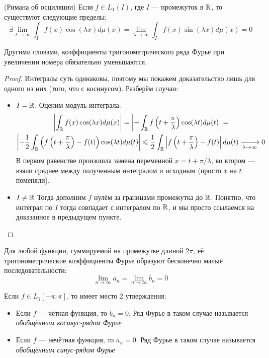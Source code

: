\begin{theorem} (Римана об осциляции)
	Если $f \in L_1(I)$, где $I$ --- промежуток в $\mathbb{R}$, то существуют следующие пределы:
	\[
		\exists \lim_{\lambda \to \infty} \int_I f(x)\cos(\lambda x)d\mu(x) = \lim_{\lambda \to \infty} \int_I f(x)\sin(\lambda x)d\mu(x) = 0
	\]
\end{theorem}

\begin{note}
	Другими словами, коэффициенты тригонометрического ряда Фурье при увеличении номера обязательно уменьшаются.
\end{note}

\begin{proof}
	Интегралы суть одинаковы, поэтому мы покажем доказательство лишь для одного из них (того, что с косинусом). Разберём случаи:
	\begin{itemize}
		\item $I = \mathbb{R}$. Оценим модуль интеграла:
		\begin{multline*}
			\left|\int_{\mathbb{R}} f(x)\cos(\lambda x)d\mu(x)\right| = \left|-\int_{\mathbb{R}} f\left(t + \frac{\pi}{\lambda}\right)\cos(\lambda t)d\mu(t)\right| =
			\\
			\left|-\frac{1}{2}\int_{\mathbb{R}} \left(f\left(t + \frac{\pi}{\lambda}\right) - f(t)\right)\cos(\lambda t)d\mu(t)\right| \leqslant \frac{1}{2}\int_{\mathbb{R}} \left|f\left(t + \frac{\pi}{\lambda}\right) - f(t)\right|d\mu(t) \xrightarrow[\lambda \to \infty]{} 0
		\end{multline*}
		В первом равенстве произошла замена переменной $x = t + \pi / \lambda$, во втором --- взяли среднее между полученным интегралом и исходным (просто $x$ на $t$ поменяли).
		
		\item $I \neq \mathbb{R}$ Тогда дополним $f$ нулём за границами промежутка до $\mathbb{R}$. Понятно, что интеграл по $I$ тогда совпадает с интегралом по $\mathbb{R}$, и мы просто ссылаемся на доказанное в предыдущем пункте.
	\end{itemize}
\end{proof}

\begin{corollary}
	Для любой функции, суммируемой на промежутке длиной $2\pi$, её тригонометрические коэффициенты Фурье образуют бесконечно малые последовательности:
	\[
		\lim_{n \to \infty} a_n = \lim_{n \to \infty} b_n = 0
	\]
\end{corollary}

\begin{proposition}
	Если $f \in L_1[-\pi; \pi]$, то имеет место 2 утверждения:
	\begin{itemize}
		\item Если $f$ --- чётная функция, то $b_n = 0$. Ряд Фурье в таком случае называется \textit{обобщённым косинус-рядом Фурье}
		
		\item Если $f$ --- нечётная функция, то $a_n = 0$. Ряд Фурье в таком случае называется \textit{обобщённым синус-рядом Фурье}
	\end{itemize}
\end{proposition}

